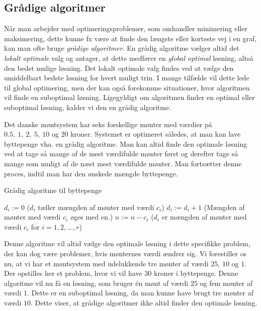\subsection{Grådige algoritmer}
Når man arbejder med optimeringsproblemer, som omhandler minimering eller maksimering, dette kunne fx være at finde den længste eller korteste vej i en graf, kan man ofte bruge \emph{grådige algoritmer}.
En grådig algoritme vælger altid det \emph{lokalt optimale} valg og antager, at dette medfører en \emph{global optimal} løsning, altså den bedst mulige løsning. Det lokalt optimale valg findes ved at vælge den umiddelbart bedste løsning for hvert muligt trin.
I mange tilfælde vil dette lede til global optimering, men der kan også forekomme situationer, hvor algoritmen vil finde en suboptimal løsning. Ligegyldigt om algoritmen finder en optimal eller suboptimal løsning, kalder vi den en grådig algoritme. 
   
    

\begin{exmp}
Det danske møntsystem har seks forskellige mønter med værdier på $0.5,\ 1,\ 2,\ 5,\ 10$ og $20$ kroner. Systemet er optimeret således, at man kan lave byttepenge vha. en grådig algoritme. Man kan altid finde den optimale løsning ved at tage så mange af de mest værdifulde mønter først og derefter tage så mange som muligt af de næst mest værdifulde mønter. Man fortsætter denne proces, indtil man har den ønskede mængde byttepenge.
\begin{algorithm} [H]
\caption{Grådig algoritme til byttepenge}
\begin{algorithmic}[1]

\EndProcedure
{}
    \State $d_i:=0$ ($d_i$ tæller mængden af mønter med værdi $c_i$)
    	\State $d_i := d_i+1$ (Mængden af mønter med værdi $c_i$ øges med en.)
    	\State $n := n-c_i$
\EndWhile
\EndFor
\State ($d_i$ er mængden af mønter med værdi $c_i$ for $i=1,2,\dotsc,r$)
\end{algorithmic}
\end{algorithm}
Denne algoritme vil altid vælge den optimale løsning i dette specifikke problem, der kan dog være problemer, hvis mønternes værdi ændrer sig. 
Vi forestiller os nu, at vi har et møntsystem med udelukkende tre mønter af værdi $25$, $10$ og $1$. Der opstilles her et problem, hvor vi vil have $30$ kroner i byttepenge. Denne algoritme vil nu få en løsning, som bruger én mønt af værdi $25$ og fem mønter af værdi $1$. Dette er en suboptimal løsning, da man kunne have brugt tre mønter af værdi $10$.
Dette viser, at grådige algoritmer ikke altid finder den optimale løsning.
\end{exmp}

